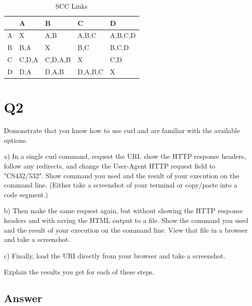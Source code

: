 \documentclass[12pt]{article}
\begin{document}
\begin{table}[h]
\centering
\caption{SCC Links}
\label{tbl:scclinks}
\begin{tabular}{|l|l|l|l|l|}
\hline
\textbf{ } & \textbf{A} & \textbf{B} & \textbf{C} & \textbf{D} \\ \hline
A & X & A,B & A,B,C & A,B,C,D \\ \hline
B & B,A & X & B,C & B,C,D \\ \hline
C & C,D,A & C,D,A,B & X & C,D \\ \hline
D & D,A & D,A,B & D,A,B,C & X \\ \hline
\end{tabular}
\end{table}

\section*{Q2}
Demonstrate that you know how to use curl and are familiar with the available options.



a) In a single curl command, request the URI, show the HTTP response headers, follow any redirects, and change the User-Agent HTTP request field to "CS432/532". Show command you used and the result of your execution on the command line. (Either take a screenshot of your terminal or copy/paste into a code segment.)

b) Then make the same request again, but without showing the HTTP response headers and with saving the HTML output to a file. Show the command you used and the result of your execution on the command line. View that file in a browser and take a screenshot.

c) Finally, load the URI directly from your browser and take a screenshot.

Explain the results you get for each of these steps.
\subsection*{Answer}
\end{document}
